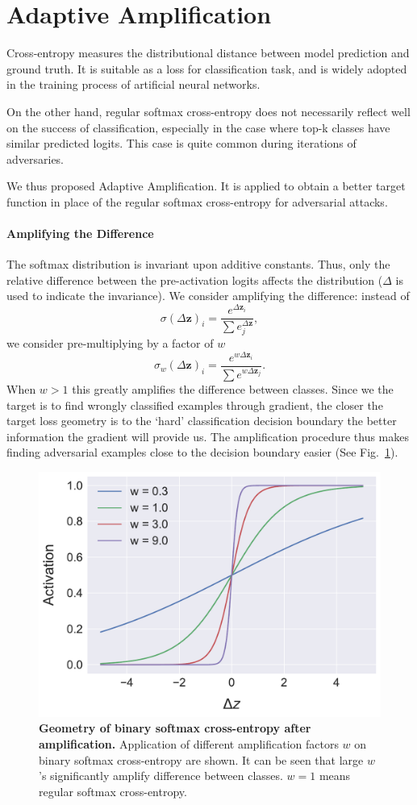 \documentclass{article}
\begin{document}
\section{Adaptive Amplification} \label{sec:AdAmp}
Cross-entropy measures the distributional distance between model prediction and ground truth. It is suitable as a loss for classification task, and is widely adopted in the training process of artificial neural networks.

On the other hand, regular softmax cross-entropy does not necessarily reflect well on the success of classification, especially in the case where top-k classes have similar predicted logits. This case is quite common during iterations of adversaries.

We thus proposed Adaptive Amplification. It is applied to obtain a better target function in place of the regular softmax cross-entropy for adversarial attacks.

\paragraph{Amplifying the Difference} The softmax distribution is invariant upon additive constants. Thus, only the relative difference between the pre-activation logits affects the distribution ($\Delta$ is used to indicate the invariance). We consider amplifying the difference: instead of
\newcommand{\vdz}{\Delta \mathbf{z}}
\begin{equation}
    \sigma(\vdz)_i = \frac{e^{\vdz_i}}{\sum e^{\vdz}_j},
\end{equation}
we consider pre-multiplying by a factor of $w$
\begin{equation}
    \sigma_w(\vdz)_i = \frac{e^{w\vdz_i}}{\sum e^{w\vdz_j}}.
\end{equation}
When $w > 1$ this greatly amplifies the difference between classes. Since we the target is to find wrongly classified examples through gradient, the closer the target loss geometry is to the `hard' classification decision boundary the better information the gradient will provide us. The amplification procedure thus makes finding adversarial examples close to the decision boundary easier (See Fig.\ \ref{fig:softmax_preamp}).

\begin{figure}[ht]
    \centering
    \includegraphics[width=0.5\linewidth]{figs/bin_amp_geo.pdf}
    \caption{\textbf{Geometry of binary softmax cross-entropy after amplification.} Application of different amplification factors $w$ on binary softmax cross-entropy are shown. It can be seen that large $w$'s significantly amplify difference between classes. $w = 1$ means regular softmax cross-entropy.}
    \label{fig:softmax_preamp}
\end{figure}
\end{document}
